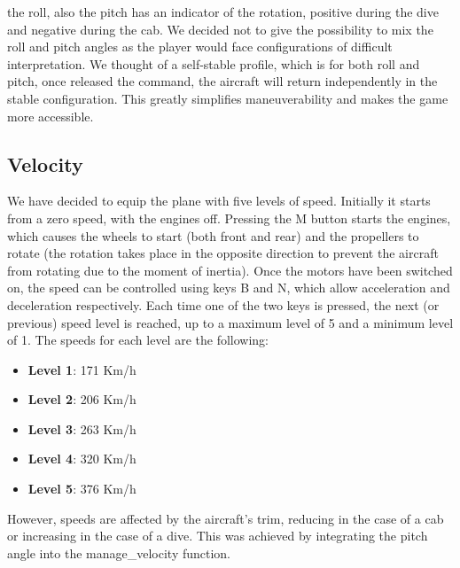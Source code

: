 \documentclass{article}
\begin{document}
the roll, also the pitch has an indicator of the rotation, positive during the dive and negative during the cab. We decided not to give the possibility to mix the roll and pitch angles as the player would face configurations of difficult interpretation. We thought of a self-stable profile, which is for both roll and pitch, once released the command, the aircraft will return independently in the stable configuration. This greatly simplifies maneuverability and makes the game more accessible.

\subsection*{Velocity}
We have decided to equip the plane with five levels of speed. Initially it starts from a zero speed, with the engines off. Pressing the M button starts the engines, which causes the wheels to start (both front and rear) and the propellers to rotate (the rotation takes place in the opposite direction to prevent the aircraft from rotating due to the moment of inertia). Once the motors have been switched on, the speed can be controlled using keys B and N, which allow acceleration and deceleration respectively. Each time one of the two keys is pressed, the next (or previous) speed level is reached, up to a maximum level of 5 and a minimum level of 1. The speeds for each level are the following:
\begin{itemize}
\item \textbf{Level 1}: 171 Km/h
\item \textbf{Level 2}: 206 Km/h
\item \textbf{Level 3}: 263 Km/h
\item \textbf{Level 4}: 320 Km/h
\item \textbf{Level 5}: 376 Km/h
\end{itemize}
However, speeds are affected by the aircraft's trim, reducing in the case of a cab or increasing in the case of a dive. This was achieved by integrating the pitch angle into the manage\_velocity function.
\end{document}
